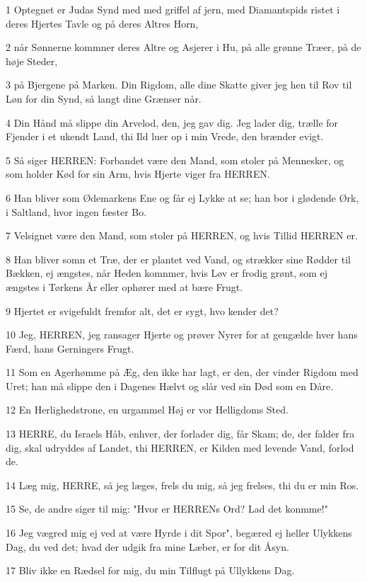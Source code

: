 \par 1 Optegnet er Judas Synd med med griffel af jern, med Diamantspids ristet i deres Hjertes Tavle og på deres Altres Horn,
\par 2 når Sønnerne kommner deres Altre og Asjerer i Hu, på alle grønne Træer, på de høje Steder,
\par 3 på Bjergene på Marken. Din Rigdom, alle dine Skatte giver jeg hen til Rov til Løn for din Synd, så langt dine Grænser når.
\par 4 Din Hånd må slippe din Arvelod, den, jeg gav dig. Jeg lader dig, trælle for Fjender i et ukendt Land, thi Ild luer op i min Vrede, den brænder evigt.
\par 5 Så siger HERREN: Forbandet være den Mand, som stoler på Mennesker, og som holder Kød for sin Arm, hvis Hjerte viger fra HERREN.
\par 6 Han bliver som Ødemarkens Ene og får ej Lykke at se; han bor i glødende Ørk, i Saltland, hvor ingen fæster Bo.
\par 7 Velsignet være den Mand, som stoler på HERREN, og hvis Tillid HERREN er.
\par 8 Han bliver somn et Træ, der er plantet ved Vand, og strækker sine Rødder til Bækken, ej ængstes, når Heden komnmer, hvis Løv er frodig grønt, som ej ængstes i Tørkens År eller ophører med at bære Frugt.
\par 9 Hjertet er svigefuldt fremfor alt, det er sygt, hvo kender det?
\par 10 Jeg, HERREN, jeg ransager Hjerte og prøver Nyrer for at gengælde hver hans Færd, hans Gerningers Frugt.
\par 11 Som en Agerhømme på Æg, den ikke har lagt, er den, der vinder Rigdom med Uret; han må slippe den i Dagenes Hælvt og slår ved sin Død som en Dåre.
\par 12 En Herlighedstrone, en urgammel Høj er vor Helligdoms Sted.
\par 13 HERRE, du Israels Håb, enhver, der forlader dig, får Skam; de, der falder fra dig, skal udryddes af Landet, thi HERREN, er Kilden med levende Vand, forlod de.
\par 14 Læg mig, HERRE, så jeg læges, frels du mig, så jeg frelses, thi du er min Ros.
\par 15 Se, de andre siger til mig: "Hvor er HERRENs Ord? Lad det konmme!"
\par 16 Jeg vægred mig ej ved at være Hyrde i dit Spor", begæred ej heller Ulykkens Dag, du ved det; hvad der udgik fra mine Læber, er for dit Åsyn.
\par 17 Bliv ikke en Rædsel for mig, du min Tilflugt på Ullykkens Dag.
